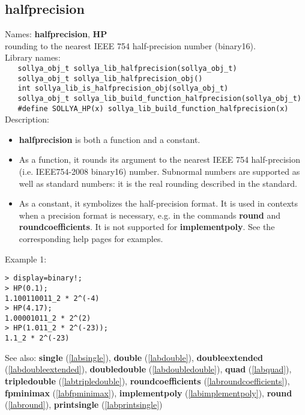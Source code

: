 \subsection{halfprecision}
\label{labhalfprecision}
\noindent Names: \textbf{halfprecision}, \textbf{HP}\\
\phantom{aaa}rounding to the nearest IEEE 754 half-precision number (binary16).\\[0.2cm]
\noindent Library names:\\
\verb|   sollya_obj_t sollya_lib_halfprecision(sollya_obj_t)|\\
\verb|   sollya_obj_t sollya_lib_halfprecision_obj()|\\
\verb|   int sollya_lib_is_halfprecision_obj(sollya_obj_t)|\\
\verb|   sollya_obj_t sollya_lib_build_function_halfprecision(sollya_obj_t)|\\
\verb|   #define SOLLYA_HP(x) sollya_lib_build_function_halfprecision(x)|\\[0.2cm]
\noindent Description: \begin{itemize}

\item \textbf{halfprecision} is both a function and a constant.

\item As a function, it rounds its argument to the nearest IEEE 754 half-precision (i.e. IEEE754-2008 binary16) number.
   Subnormal numbers are supported as well as standard numbers: it is the real
   rounding described in the standard.

\item As a constant, it symbolizes the half-precision format. It is used in 
   contexts when a precision format is necessary, e.g. in the commands 
   \textbf{round} and \textbf{roundcoefficients}. It is not supported for \textbf{implementpoly}.
   See the corresponding help pages for examples.
\end{itemize}
\noindent Example 1: 
\begin{center}\begin{minipage}{15cm}\begin{Verbatim}[frame=single,commandchars=\\\|\~]
> display=binary!;
> HP(0.1);
1.100110011_2 * 2^(-4)
> HP(4.17);
1.00001011_2 * 2^(2)
> HP(1.011_2 * 2^(-23));
1.1_2 * 2^(-23)
\end{Verbatim}
\end{minipage}\end{center}
See also: \textbf{single} (\ref{labsingle}), \textbf{double} (\ref{labdouble}), \textbf{doubleextended} (\ref{labdoubleextended}), \textbf{doubledouble} (\ref{labdoubledouble}), \textbf{quad} (\ref{labquad}), \textbf{tripledouble} (\ref{labtripledouble}), \textbf{roundcoefficients} (\ref{labroundcoefficients}), \textbf{fpminimax} (\ref{labfpminimax}), \textbf{implementpoly} (\ref{labimplementpoly}), \textbf{round} (\ref{labround}), \textbf{printsingle} (\ref{labprintsingle})
